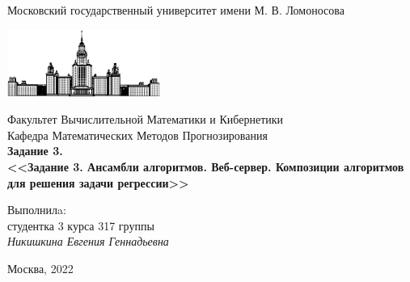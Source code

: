 \documentclass[12pt]{article}
\begin{document}
\begin{titlepage}
\begin{center}
    Московский государственный университет имени М. В. Ломоносова

    \bigskip
    \includegraphics[width=50mm]{msu.eps}

    \bigskip
    Факультет Вычислительной Математики и Кибернетики\\
    Кафедра Математических Методов Прогнозирования\\[10mm]

    \textsf{\large\bfseries
        Задание 3.\\[10mm]
        <<Задание 3. Ансамбли алгоритмов. Веб-сервер. Композиции алгоритмов для решения задачи регрессии>>
    }\\[10mm]

    \begin{flushright}
        \parbox{0.5\textwidth}{
        	Выполнилa:\\
        	студентка 3 курса 317 группы \\
        	\emph{Никишкина Евгения Геннадьевна}\\[5mm]
        }
    \end{flushright}

    \vspace{\fill}
    Москва, 2022
\end{center}
\end{titlepage}


\newpage
\renewcommand{\contentsname}{Содержание}
\tableofcontents
\end{document}
